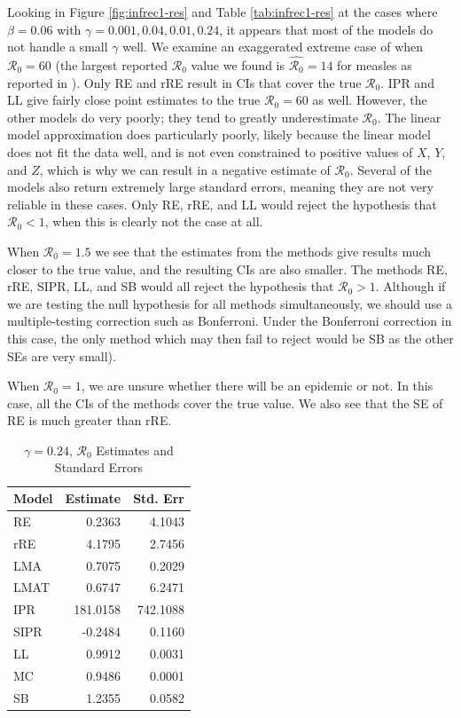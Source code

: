 \documentclass[12pt]{article}
\newcommand{\rr}{\ensuremath{\mathcal{R}_0}}
\begin{document}
Looking in Figure \ref{fig:infrec1-res} and Table \ref{tab:infrec1-res} at the cases where $\beta = 0.06$ with $\gamma = 0.001, 0.04, 0.01, 0.24$, it appears that most of the models do not handle a small $\gamma$ well.  We examine an exaggerated extreme case of when $\rr=60$ (the largest reported $\rr$ value we found is $\hat{\rr}=14$ for measles as reported in \cite{anderson1992}). Only RE and rRE result in CIs that cover the true $\rr$. IPR and LL give fairly close point estimates to the true $\rr=60$ as well. However, the other models do very poorly; they tend to greatly underestimate $\rr$. The linear model approximation does particularly poorly, likely because the linear model does not fit the data well, and is not even constrained to positive values of $X$, $Y$, and $Z$, which is why we can result in a negative estimate of $\rr$. Several of the models also return extremely large standard errors, meaning they are not very reliable in these cases.  Only RE, rRE, and LL would reject the hypothesis that $\rr <1$, when this is clearly not the case at all.

When $\rr=1.5$ we see that the estimates from the methods give results much closer to the true value, and the resulting CIs are also smaller.  The methods RE, rRE, SIPR, LL, and SB would all reject the hypothesis that $\rr > 1$.  Although if we are testing the null hypothesis for  all methods simultaneously, we should use a multiple-testing correction such as Bonferroni.  Under the Bonferroni correction in this case, the only method which may then fail to reject would be SB as the other SEs are very small).

When $\rr=1$, we are unsure whether there will be an epidemic or not.  In this case, all the CIs of the methods cover the true value.  We also see that the SE of RE is much greater than rRE.

\begin{table}[H]

	\centering
	\begin{tabular}[t]{l|r|r}
		\hline
		Model & Estimate & Std. Err\\
		\hline
		RE & 0.2363 & 4.1043 \\
		\hline
		rRE & 4.1795 & 2.7456\\
		\hline
		LMA &  0.7075 & 0.2029 \\
		\hline
		LMAT & 0.6747 & 6.2471 \\
		\hline
		IPR & 181.0158 & 742.1088 \\
		\hline
		SIPR & -0.2484 & 0.1160 \\
		\hline
		LL & 0.9912 & 0.0031\\
		\hline
		MC & 0.9486 & 0.0001\\
		\hline
		SB & 1.2355 & 0.0582\\
		\hline
	\end{tabular}
        \caption{$\gamma = 0.24$, $\rr$ Estimates and Standard Errors}\label{tab:infrec4-res}
\end{table}
\end{document}
